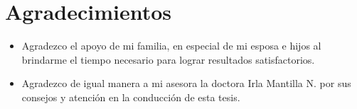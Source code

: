 \chapter*{Agradecimientos}
\begin{itemize}
	\item Agradezco el apoyo de mi familia, en especial de mi esposa e hijos al brindarme el tiempo necesario para lograr resultados satisfactorios.
	\item Agradezco de igual manera a mi asesora  la doctora Irla Mantilla N. por sus consejos y atención en la conducción de esta tesis.
\end{itemize}